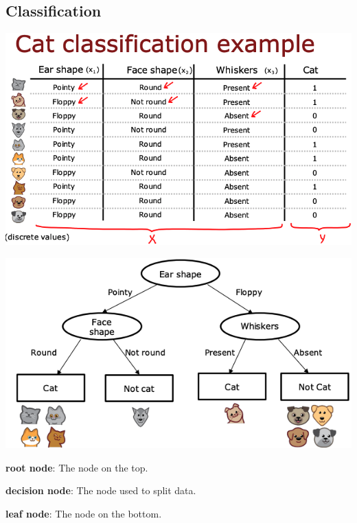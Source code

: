 \documentclass{article}
\begin{document}
\subsection{Classification}

\begin{center}
\includegraphics[scale=0.4]{./images/decision_tree_classification_data.png}
\end{center}

\begin{center}
\includegraphics[scale=0.5]{./images/decision_tree_classification_process.png}
\end{center}

\noindent \textbf{root node}: The node on the top.

\bigskip

\noindent \textbf{decision node}: The node used to split data.

\bigskip

\noindent \textbf{leaf node}: The node on the bottom.

\bigskip
\end{document}
